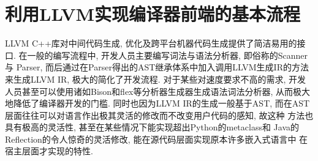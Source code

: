 \documentclass[UTF8]{ctexart}
\begin{document}
\section{利用LLVM实现编译器前端的基本流程}
LLVM C++库对中间代码生成, 优化及跨平台机器代码生成提供了简洁易用的接口.
在一般的编写流程中, 开发人员主要编写词法与语法分析器, 即俗称的Scanner与
Parser, 而后通过在Parser得出的AST继承体系中加入调用LLVM生成IR的方法
来生成LLVM IR, 极大的简化了开发流程. 对于某些对速度要求不高的需求, 
开发人员甚至可以使用诸如Bison和flex等分析器生成器生成语法词法分析器,
从而极大地降低了编译器开发的门槛. 同时也因为LLVM IR的生成一般基于AST, 
而在AST层面往往可以对语言作出极其灵活的修改而不改变用户代码的感知, 故这种
方法也具有极高的灵活性, 甚至在某些情况下能实现超出Python的metaclass和
Java的Reflection的令人惊奇的灵活修改, 能在源代码层面实现原本许多嵌入式语言中
在宿主层面才实现的特性.
\end{document}
